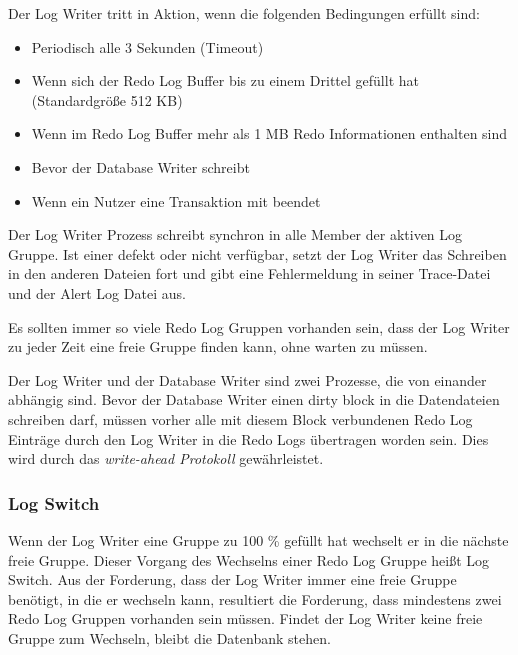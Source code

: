 
          \begin{merke}
            Der Log Writer tritt in Aktion, wenn die folgenden Bedingungen erfüllt sind:
            \begin{itemize}
              \item Periodisch alle 3 Sekunden (Timeout)
              \item Wenn sich der Redo Log Buffer bis zu einem Drittel gefüllt hat (Standardgröße 512 KB)
              \item Wenn im Redo Log Buffer mehr als 1 MB Redo Informationen enthalten sind
              \item Bevor der Database Writer schreibt
              \item Wenn ein Nutzer eine Transaktion mit  beendet
            \end{itemize}
          \end{merke}
          Der Log Writer Prozess schreibt synchron in alle Member der aktiven Log Gruppe. Ist einer defekt oder nicht verfügbar, setzt der Log Writer das Schreiben in den anderen Dateien fort und gibt eine Fehlermeldung in seiner Trace-Datei und der Alert Log Datei aus.

          \begin{merke}
            Es sollten immer so viele Redo Log Gruppen vorhanden sein, dass der Log Writer zu jeder Zeit eine freie Gruppe finden kann, ohne warten zu müssen.
          \end{merke}
          Der Log Writer und der Database Writer sind zwei Prozesse, die von einander abhängig sind. Bevor der Database Writer einen dirty block in die Datendateien schreiben darf, müssen vorher alle mit diesem Block verbundenen Redo Log Einträge durch den Log Writer in die Redo Logs übertragen worden sein. Dies wird durch das \textit{write-ahead Protokoll} gewährleistet.
          \subsubsection{Log Switch}
            Wenn der Log Writer eine Gruppe zu 100 \% gefüllt hat wechselt er in die nächste freie Gruppe. Dieser Vorgang des Wechselns einer Redo Log Gruppe heißt Log Switch. Aus der Forderung, dass der Log Writer immer eine freie Gruppe benötigt, in die er wechseln kann, resultiert die Forderung, dass mindestens zwei Redo Log Gruppen vorhanden sein müssen. Findet der Log Writer keine freie Gruppe zum Wechseln, bleibt die Datenbank stehen.

